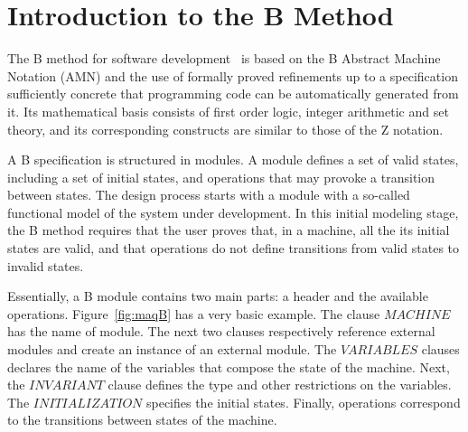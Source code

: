 \documentclass[11pt]{article} %
\begin{document}
\section{Introduction to the B Method}
\label{sec:B_method}

The B method for software development~\cite{Abrial} is based on the B Abstract
Machine Notation (AMN) and the use of formally proved refinements up to a
specification sufficiently concrete that programming code can be automatically
generated from it. Its mathematical basis consists of first order logic, integer
arithmetic and set theory, and its corresponding constructs are similar to those
of the Z notation.

A B specification is structured in modules. A module defines a set of valid
states, including a set of initial states, and operations that may provoke a
transition between states. The design process starts with a module with a
so-called functional model of the system under development. In this initial
modeling stage, the B method requires that the user proves that, in a machine,
all the its initial states are valid, and that operations do not define
transitions from valid states to invalid states.
  
Essentially, a B module contains two main parts: a header and the available
operations. Figure~\ref{fig:maqB} has a very basic example. The clause
$\mathit{MACHINE}$ has the name of module.  The next two clauses respectively
reference external modules and create an instance of an external module. The
$\mathit{VARIABLES}$ clauses declares the name of the variables that compose the
state of the machine. Next, the $\mathit{INVARIANT}$ clause defines the type and
other restrictions on the variables. The $\mathit{INITIALIZATION} $ specifies
the initial states. Finally, operations correspond to the transitions between
states of the machine.
\end{document}
